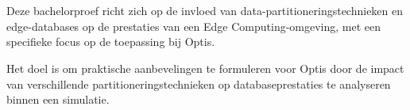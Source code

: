
%
%
%
%
%

%



\chapter*{}

Deze bachelorproef richt zich op de invloed van data-partitioneringstechnieken en edge-databases op de prestaties van een Edge Computing-omgeving, met een specifieke focus op de toepassing bij Optis.

Het doel is om praktische aanbevelingen te formuleren voor Optis door de impact van verschillende partitioneringstechnieken op databaseprestaties te analyseren binnen een simulatie. 

